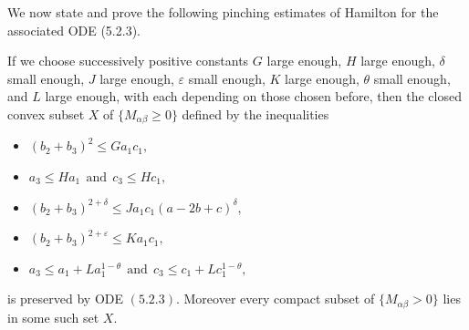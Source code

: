 We now state and prove the following pinching estimates of
Hamilton for the associated ODE (5.2.3).

\begin{proposition}
  \label{prop:cz-four-dimensional-invariant-curvature-pinching-set}

If we choose successively positive constants $G$ large enough, $H$
large enough, $\delta$ small enough, $J$ large enough,
$\varepsilon$ small enough, $K$ large enough, $\theta$ small
enough, and $L$ large enough, with each depending on those chosen
before, then the closed convex subset $X$ of
$\{M_{\alpha\beta}\geq 0 \}$ defined by the inequalities
\begin{itemize}
\item[(1)] $(b_2+b_3)^2\leq Ga_1c_1,$ \item[(2)] $a_3\leq Ha_1 \ \
\text{and}\ \ c_3\leq Hc_1,$ \item[(3)] $(b_2+b_3)^{2+\delta}\leq
Ja_1c_1(a-2b+c)^{\delta},$ \item[(4)]
$(b_2+b_3)^{2+\varepsilon}\leq Ka_1c_1,$ \item[(5)] $a_3\leq
a_1+La_1^{1-\theta}\ \ \text{and} \ \ c_3\leq
c_1+Lc_1^{1-\theta},$
\end{itemize}
is preserved by {\rm ODE} $(5.2.3)$. Moreover every compact subset
of $\{M_{\alpha\beta}>0\}$ lies in some such set $X$.
\end{proposition}

